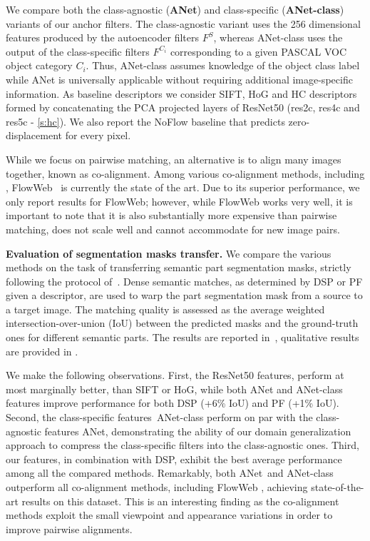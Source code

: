 \documentclass[10pt,twocolumn,letterpaper]{article}
\def\methodname{ANet\xspace}
\newcommand{\myparagraph}[1]{\vspace{0.15cm}\noindent\textbf{#1.}}
\begin{document}
We compare both the class-agnostic (\textbf{\methodname}) and class-specific (\textbf{\methodname-class}) variants of our anchor filters. 
The class-agnostic variant uses the 256 dimensional features produced by the autoencoder filters $F^S$, whereas
\methodname-class uses the output of the class-specific filters $F^{C_i}$ corresponding to a given PASCAL VOC object category $C_i$. Thus, \methodname-class assumes
knowledge of the object class label while \methodname is universally applicable without requiring additional image-specific information.
As baseline descriptors we consider SIFT, HoG and HC descriptors formed by concatenating the PCA projected layers of ResNet50 (res2c, res4c and res5c - \cref{s:hc}).
We also report the NoFlow baseline that predicts zero-displacement for every pixel. %

While we focus on pairwise matching, an alternative is to align many images together, known as co-alignment. Among various co-alignment methods, including \cite{huang07unsupervised,peng2010rasl,kemelmacher2012collection}, FlowWeb~\cite{zhou15flowweb} is currently the state of the art. Due to its superior performance, we only report results for FlowWeb; however, while FlowWeb works very well, it is important to note that it is also substantially more expensive than pairwise matching, does not scale well and cannot accommodate for new image pairs. 

\myparagraph{Evaluation of segmentation masks transfer} We compare the various methods on the task of transferring semantic part segmentation masks, strictly following the protocol of~\cite{zhou15flowweb}. Dense semantic matches, as determined by DSP or PF given a descriptor, are used to warp the part segmentation mask from a source to a target image. The matching quality is assessed as the average weighted intersection-over-union (IoU) between the predicted masks and the ground-truth ones for different semantic parts. 
The results are reported in~, qualitative results are provided in .

We make the following observations. 
First, the ResNet50 features, perform at most marginally better, than SIFT or HoG, while both \methodname and \methodname-class features
improve performance for both DSP (+6\% IoU) and PF (+1\% IoU). %
Second, the class-specific features~\methodname-class perform on par with the class-agnostic features \methodname, 
demonstrating the ability of our domain generalization approach to compress the class-specific filters into the class-agnostic ones.
Third, our features, in combination with DSP, exhibit the best average performance among all the compared methods. Remarkably, both \methodname~and \methodname-class outperform all co-alignment methods, including FlowWeb \cite{zhou15flowweb}, achieving state-of-the-art results on this dataset. This is an interesting finding as the co-alignment methods exploit the small viewpoint and appearance variations in order to improve pairwise alignments.
\end{document}
